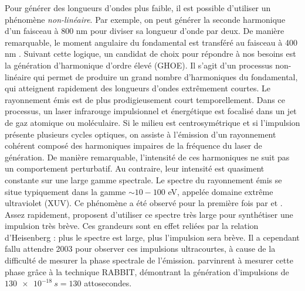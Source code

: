 Pour générer des longueurs d'ondes plus faible, il est possible d'utiliser un phénomène \textit{non-linéaire}. Par exemple, on peut générer la seconde harmonique d'un faisceau à 800 nm pour diviser sa longueur d'onde par deux. De manière remarquable, le moment angulaire du fondamental est transféré au faisceau à 400 nm . Suivant cette logique, un candidat de choix pour répondre à nos besoins est la génération d'harmonique d'ordre élevé (GHOE). Il s'agit d'un processus non-linéaire qui permet de produire un grand nombre d'harmoniques du fondamental, qui atteignent rapidement des longueurs d'ondes extrêmement courtes. Le rayonnement émis est de plus prodigieusement court temporellement. Dans ce processus, un laser infrarouge impulsionnel et énergétique est focalisé dans un jet de gaz atomique ou moléculaire. Si le milieu est centrosymétrique et si l'impulsion présente plusieurs cycles optiques, on assiste à l'émission d'un rayonnement cohérent composé des harmoniques impaires de la fréquence du laser de génération. De manière remarquable, l'intensité de ces harmoniques ne suit pas un comportement perturbatif. Au contraire, leur intensité est quasiment constante sur une large gamme spectrale. Le spectre du rayonnement émis se situe typiquement dans la gamme $\sim 10-100$ eV, appelée domaine extrême ultraviolet (XUV). Ce phénomène a été observé pour la première fois par  et . Assez rapidement,  proposent d'utiliser ce spectre très large pour synthétiser une impulsion très brève. Ces grandeurs sont en effet reliées par la relation d'Heisenberg : plus le spectre est large, plus l'impulsion sera brève. Il a cependant fallu attendre 2003 pour observer ces impulsions ultracourtes, à cause de la difficulté de mesurer la phase spectrale de l'émission.  parvinrent à mesurer cette phase grâce à la technique RABBIT, démontrant la génération d'impulsions de $\SI{130e-18}{s} = 130$ attosecondes. 

